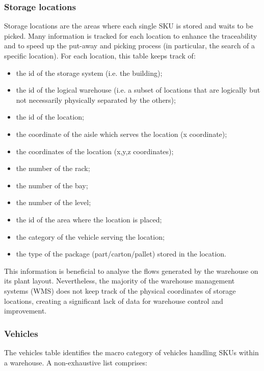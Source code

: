 \subsubsection{Storage locations}

Storage locations are the areas where each single SKU is stored and waits to be picked. Many information is tracked for each location to enhance the traceability and to speed up the put-away and picking process (in particular, the search of a specific location). For each location, this table keeps track of:

\begin{itemize}
    \item the id of the storage system (i.e. the building);
    \item the id of the logical warehouse (i.e. a subset of locations that are logically but not necessarily physically separated by the others);
    \item the id of the location;
    \item the coordinate of the aisle which serves the location (x coordinate);
    \item the coordinates of the location (x,y,z coordinates);
    \item the number of the rack;
    \item the number of the bay;
    \item the number of the level;
    \item the id of the area where the location is placed;
    \item the category of the vehicle serving the location;
    \item the type of the package (part/carton/pallet) stored in the location.

\end{itemize}

This information is beneficial to analyse the flows generated by the warehouse on its plant layout. Nevertheless, the majority of the warehouse management systems (WMS) does not keep track of the physical coordinates of storage locations, creating a significant lack of data for warehouse control and improvement.

\subsubsection{Vehicles}
The vehicles table identifies the macro category of vehicles handling SKUs within a warehouse. A non-exhaustive list comprises:

